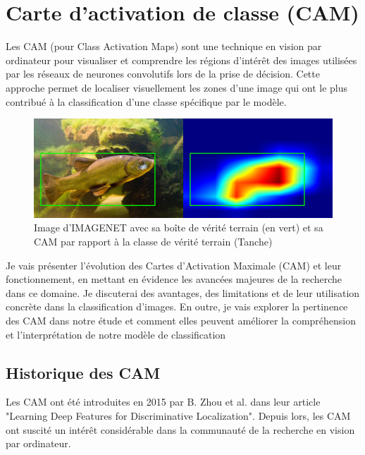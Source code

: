 \documentclass{report}
\begin{document}
{\section{Carte d'activation de classe (CAM)}
\hspace{1.6cm}Les CAM (pour Class Activation Maps) sont une technique en vision par ordinateur pour visualiser et comprendre les régions d'intérêt des images utilisées par les réseaux de neurones convolutifs lors de la prise de décision. Cette approche permet de localiser visuellement les zones d'une image qui ont le plus contribué à la classification d'une classe spécifique par le modèle.
\vspace*{0.5\baselineskip}
\begin{figure}[htbp] 
	\centering
        \includegraphics[width=16cm]{logo/CAM.png} 
	\caption{Image d'IMAGENET avec sa boîte de vérité terrain (en vert) et sa CAM par rapport à la classe de vérité terrain (Tanche)}
	\label{fig:Exemple d'image provenant d'IMAGENET avec sa carte d'activation}
\end{figure}

\hspace{1.6cm}Je vais présenter l'évolution des Cartes d'Activation Maximale (CAM) et leur fonctionnement, en mettant en évidence les avancées majeures de la recherche dans ce domaine. Je discuterai des avantages, des limitations et de leur utilisation concrète dans la classification d'images. En outre, je vais explorer la pertinence des CAM dans notre étude et comment elles peuvent améliorer la compréhension et l'interprétation de notre modèle de classification


\subsection{Historique des CAM}

\hspace{1.6cm}Les CAM ont été introduites en 2015 par B. Zhou et al. dans leur article "Learning Deep Features for Discriminative Localization"\cite{Zhou_2016_CVPR}. Depuis lors, les CAM ont suscité un intérêt considérable dans la communauté de la recherche en vision par ordinateur.

}
\end{document}
